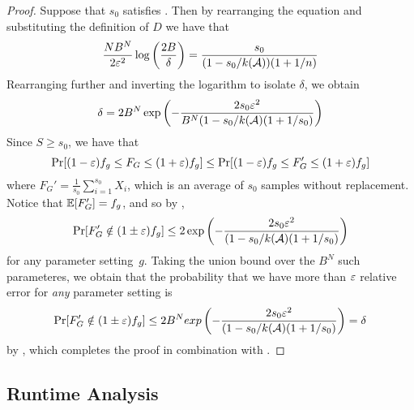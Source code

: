 \begin{proof}
Suppose that $s_0$ satisfies .
Then by rearranging the equation and substituting the definition of $D$ we have that
\[
\frac{N B^N}{2 \varepsilon^2} \log \left(\frac{2B}{\delta}\right)
= \frac{s_0}{(1 - s_0/k(\mathcal{A}))(1 + 1/n)}
\]
Rearranging further and inverting the logarithm to isolate $\delta$, we obtain
\begin{equation} \label{eq:long-derivation}
\delta = 2 B^N \exp \left( - \frac{2s_0 \varepsilon^2}{B^N (1 - s_0/k(\mathcal{A}) (1 + 1/s_0)} \right)
\end{equation}
Since $S \geq s_0$, we have that
\begin{equation} \label{eq:upper-bound}
\Pr[(1 - \varepsilon) f_g \leq F_G \leq (1 + \varepsilon) f_g]
\leq \Pr[(1 - \varepsilon) f_g \leq F_G' \leq (1 + \varepsilon) f_g]
\end{equation}
where $F_G' = \frac{1}{s_0} \sum_{i = 1}^{s_0} X_i$, which is an average of $s_0$ samples without replacement.
Notice that $\mathbb{E}[F_G'] = f_g$, and so by ,
\[
\Pr[F_G' \notin (1 \pm \varepsilon)f_g]
\leq 2 \exp \left( - \frac{2s_0 \varepsilon^2}{(1 - s_0/k(\mathcal{A}) (1 + 1/s_0)} \right)
\]
for any parameter setting~$g$.
Taking the union bound over the $B^N$ such parameteres, we obtain that the probability that we have more than $\varepsilon$ relative error for \emph{any} parameter setting is
\[
\Pr[F_G' \notin (1 \pm \varepsilon)f_g]
\leq 2 B^N exp \left( - \frac{2s_0 \varepsilon^2}{(1 - s_0/k(\mathcal{A}) (1 + 1/s_0)} \right) = \delta
\]
by , which completes the proof in combination with .
\end{proof}


    \subsection{Runtime Analysis}
